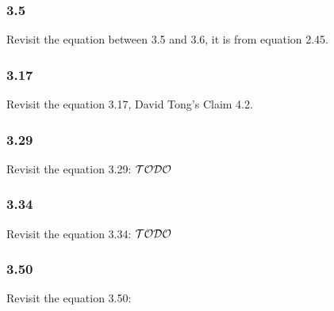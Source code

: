 
\subsubsection{3.5}

Revisit the equation between 3.5 and 3.6, it is from equation 2.45.

\subsubsection{3.17}

Revisit the equation 3.17, David Tong's Claim 4.2.

\subsubsection{3.29}

Revisit the equation 3.29: $\mathcal{TODO}$

\subsubsection{3.34}

Revisit the equation 3.34: $\mathcal{TODO}$

\subsubsection{3.50}

Revisit the equation 3.50:


